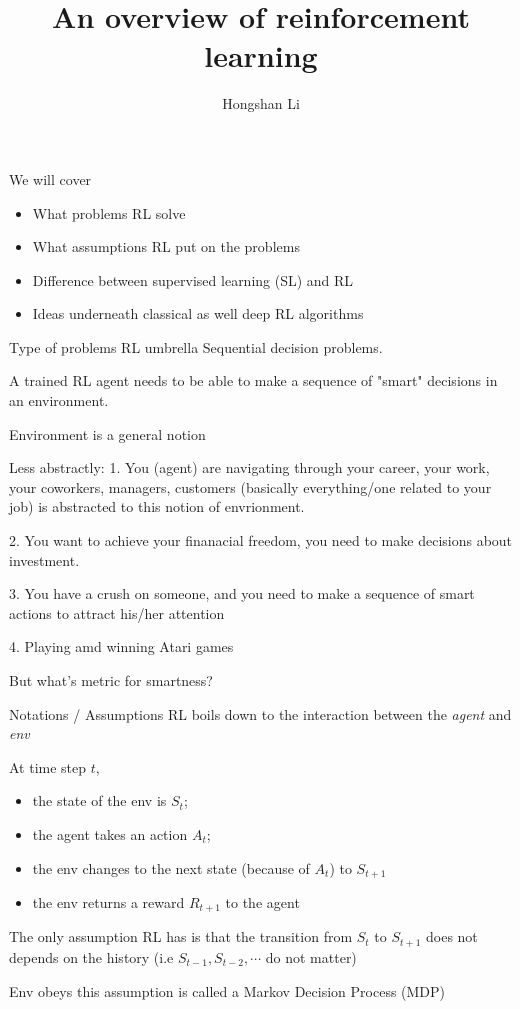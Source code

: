 \documentclass{beamer}
\title{An overview of reinforcement learning}
\author{Hongshan Li}
\begin{document}
\begin{frame}{We will cover}
\begin{itemize}
\item What problems RL solve
\item What assumptions RL put on the problems
\item Difference between supervised learning (SL) and RL
\item Ideas underneath classical as well deep RL algorithms
\end{itemize}
\end{frame}

\begin{frame}{Type of problems RL umbrella}
Sequential decision problems.

A trained RL agent needs to be able to make a 
sequence of "smart" decisions in an environment.

Environment is a general notion

Less abstractly: 
1. You (agent) are navigating through your career, your work, your coworkers, managers, customers (basically everything/one related to your job) is abstracted
to this notion of envrionment.

2. You  want to achieve your finanacial freedom, you need to make decisions
about investment. 

3. You have a crush on someone, and you need to make a sequence of smart actions to 
attract his/her attention

4. Playing amd winning Atari games

But what's metric for smartness?
\end{frame}

\begin{frame}{Notations / Assumptions}
RL boils down to the interaction between the \emph{agent} and \emph{env}

At time step $t$, 
\begin{itemize}
\item the state of the env is $S_t$; 
\item the agent takes an action $A_t$;
\item the env changes to the next state (because of $A_t$) to $S_{t+1}$
\item the env returns a reward $R_{t+1}$ to the agent
\end{itemize}

The only assumption RL has is that the transition from 
$S_t$ to $S_{t+1}$ does not depends on the history (i.e
$S_{t-1}, S_{t-2},\cdots$ do not matter)

Env obeys this assumption is called a Markov Decision Process (MDP)
\end{frame}
\end{document}
